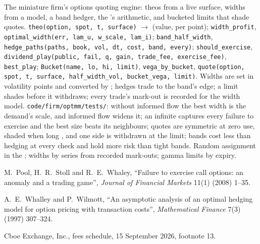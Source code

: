 \begin{build}
 The miniature firm's options quoting engine: theos from a live surface, widths from a model, a band hedger, the 's arithmetic,
and bucketed limits that shade quotes.
 \texttt{theo(option, spot, t, surface)} $\to$ (value,  per point); \texttt{width\_profit}, \texttt{optimal\_width(err, lam\_u, w\_scale,
lam\_i)}; \texttt{band\_half\_width}, \texttt{hedge\_paths(paths, book, vol, dt, cost, band, every)}; \texttt{should\_exercise}, \texttt{dividend\_play(public,
fail, q, gain, trade\_fee, exercise\_fee)}, \texttt{best\_play}; \texttt{Bucket(name, lo, hi, limit)}, \texttt{vega\_by\_bucket}, \texttt{quote(option, spot, t,
surface, half\_width\_vol, bucket\_vega, limit)}.
 Widths are set in volatility points and converted by ; hedges trade to the band's edge; a limit shades before it withdraws; every trade's
mark-out is recorded for the width model.
 \texttt{code/firm/optmm/tests/}: without informed flow the best width is the demand's scale, and informed flow widens it; an infinite
 captures every failure to exercise and the best size beats its neighbours; quotes are symmetric at zero use, shaded when long , and one side is
withdrawn at the limit; bands cost less than hedging at every check and hold more risk than tight bands.
 Random assignment in the ; widths by series from recorded mark-outs; gamma limits by expiry.
\end{build}

\begin{omsources}
\item M.~Pool, H.~R.~Stoll and R.~E.~Whaley, ``Failure to exercise call options: an anomaly and a trading game'', \emph{Journal of Financial Markets} 11(1)
(2008) 1--35.
\item A.~E.~Whalley and P.~Wilmott, ``An asymptotic analysis of an optimal hedging model for option pricing with transaction costs'', \emph{Mathematical Finance}
7(3) (1997) 307--324.
\item Cboe Exchange, Inc., fees schedule, 15 September 2026, footnote 13.
\end{omsources}

